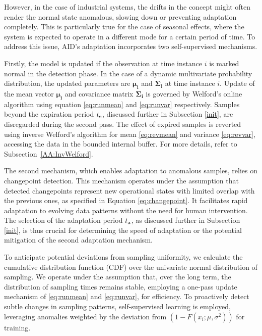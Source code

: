 However, in the case of industrial systems, the drifts in the concept might often render the normal state anomalous, slowing down or preventing adaptation completely. This is particularly true for the case of seasonal effects, where the system is expected to operate in a different mode for a certain period of time. To address this issue, AID's adaptation incorporates two self-supervised mechanisms.

Firstly, the model is updated if the observation at time instance \(i\) is marked normal in the detection phase. In the case of a dynamic multivariate probability distribution, the updated parameters are $\boldsymbol{\mu_i}$ and $\boldsymbol{\Sigma_i}$ at time instance \(i\). Update of the mean vector $\boldsymbol{\mu_i}$ and covariance matrix $\boldsymbol{\Sigma_i}$ is governed by Welford's online algorithm using equation \eqref{eq:runmean} and \eqref{eq:runvar} respectively. Samples beyond the expiration period $t _{\text{e}}$, discussed further in Subsection \ref{init}, are disregarded during the second pass. The effect of expired samples is reverted using inverse Welford's algorithm for mean \eqref{eq:revmean} and variance \eqref{eq:revvar}, accessing the data in the bounded internal buffer. For more details, refer to Subsection~\ref{AA:InvWelford}.

The second mechanism, which enables adaptation to anomalous samples, relies on changepoint detection. This mechanism operates under the assumption that detected changepoints represent new operational states with limited overlap with the previous ones, as specified in Equation \ref{eq:changepoint}. It facilitates rapid adaptation to evolving data patterns without the need for human intervention. The selection of the adaptation period $t _{\text{a}}$, as discussed further in Subsection \ref{init}, is thus crucial for determining the speed of adaptation or the potential mitigation of the second adaptation mechanism.

To anticipate potential deviations from sampling uniformity, we calculate the cumulative distribution function (CDF) over the univariate normal distribution of sampling. We operate under the assumption that, over the long term, the distribution of sampling times remains stable, employing a one-pass update mechanism of \eqref{eq:runmean} and \eqref{eq:runvar}, for efficiency. To proactively detect subtle changes in sampling patterns, self-supervised learning is employed, leveraging anomalies weighted by the deviation from $(1 - F(x_i; \mu, \sigma^2))$ for training.

